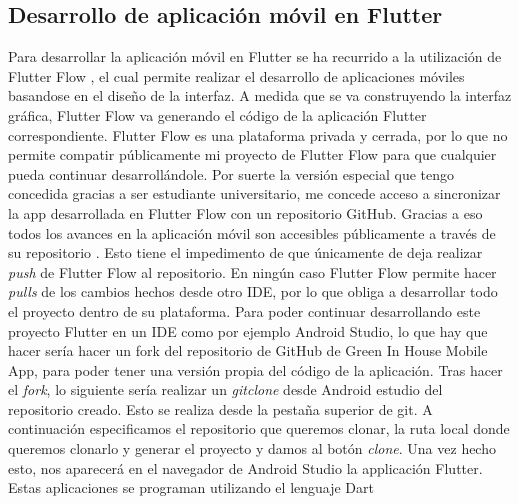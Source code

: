     \subsection{Desarrollo de aplicación móvil en Flutter}
    Para desarrollar la aplicación móvil en Flutter \cite{wiki:flutter} se ha recurrido a la utilización de Flutter Flow \cite{wiki:flutter_flow}, el cual permite realizar el desarrollo de aplicaciones móviles basandose en el diseño de la interfaz. A medida que se va construyendo la interfaz gráfica, Flutter Flow va generando el código de la aplicación Flutter correspondiente. 
    Flutter Flow es una plataforma privada y cerrada, por lo que no permite compatir públicamente mi proyecto de Flutter Flow para que cualquier pueda continuar desarrollándole. Por suerte la versión especial que tengo concedida gracias a ser estudiante universitario, me concede acceso a sincronizar la app desarrollada en Flutter Flow con un repositorio GitHub. Gracias a eso todos los avances en la aplicación móvil son accesibles públicamente a través de su repositorio \cite{GreenInHouse:repo:AppMovil}. Esto tiene el impedimento de que únicamente de deja realizar \textit{push} de Flutter Flow al repositorio. En ningún caso Flutter Flow permite hacer \textit{pulls} de los cambios hechos desde otro IDE, por lo que obliga a desarrollar todo el proyecto dentro de su plataforma.
    Para poder continuar desarrollando este proyecto Flutter en un IDE como por ejemplo Android Studio, lo que hay que hacer sería hacer un fork del repositorio de GitHub de Green In House Mobile App, para poder tener una versión propia del código de la aplicación. Tras hacer el \textit{fork}, lo siguiente sería realizar un \textit{gitclone} desde Android estudio del repositorio creado. Esto se realiza desde la pestaña superior de git.
    A continuación especificamos el repositorio que queremos clonar, la ruta local donde queremos clonarlo y generar el proyecto y damos al botón \textit{clone}.
    Una vez hecho esto, nos aparecerá en el navegador de Android Studio la applicación Flutter. Estas aplicaciones se programan utilizando el lenguaje Dart \cite{wiki:dart}
        
